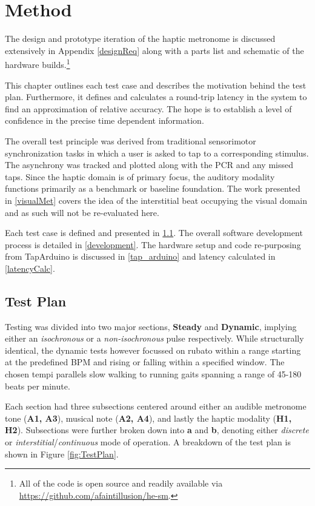 \chapter{Method}
The design and prototype iteration of the haptic metronome is discussed extensively in Appendix \ref{designReq} along with a parts list and schematic of the hardware builds.\footnote{All of the code is open source and readily available via \url{https://github.com/afaintillusion/he-sm}.}

This chapter outlines each test case and describes the motivation behind the test plan. Furthermore, it defines and calculates a round-trip latency in the system to find an approximation of relative accuracy. The hope is to establish a level of confidence in the precise time dependent information.

The overall test principle was derived from traditional sensorimotor synchronization tasks in which a user is asked to tap to a corresponding stimulus. The asynchrony was tracked and plotted along with the PCR and any missed taps. Since the haptic domain is of primary focus, the auditory modality functions primarily as a benchmark or baseline foundation. The work presented in \ref{visualMet} covers the idea of the interstitial beat occupying the visual domain and as such will not be re-evaluated here.

Each test case is defined and presented in \ref{testPlan}. The overall software development process is detailed in \ref{development}. The hardware setup and code re-purposing from TapArduino is discussed in \ref{tap_arduino} and latency calculated in \ref{latencyCalc}.

\section{Test Plan} \label{testPlan}
Testing was divided into two major sections, \textbf{Steady} and \textbf{Dynamic}, implying either an \textit{isochronous} or a \textit{non-isochronous} pulse respectively. While structurally identical, the dynamic tests however focussed on rubato within a range starting at the predefined BPM and rising or falling within a specified window. The chosen tempi parallels slow walking to running gaits spanning a range of 45-180 beats per minute.

Each section had three subsections centered around either an audible metronome tone (\textbf{A1, A3}), musical note (\textbf{A2, A4}), and lastly the haptic modality (\textbf{H1, H2}). Subsections were further broken down into \textbf{a} and \textbf{b}, denoting either \textit{discrete} or \textit{interstitial}/\textit{continuous} mode of operation. A breakdown of the test plan is shown in Figure \ref{fig:TestPlan}.

